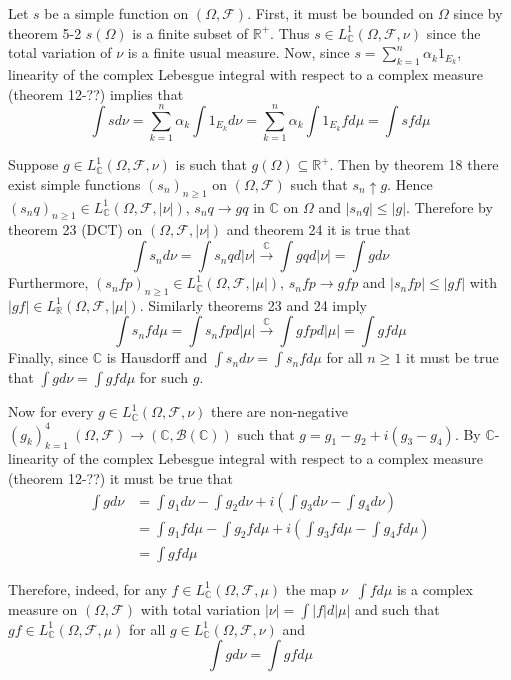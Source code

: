 \documentclass[a4paper]{article}
\newcommand{\brac}[1]{\left ( #1 \right )}
\newcommand{\abs}[1]{\left | #1 \right |}
\newcommand{\Real}{\mathbb{R}}
\newcommand{\Cplx}{\mathbb{C}}
\newcommand{\Fcal}{\mathcal{F}}
\newcommand{\borel}[1]{\mathcal{B}\brac{#1}}
\newcommand{\defn}{\mathop{\overset{\Delta}{=}}\nolimits}
\begin{document}
Let $s$ be a simple function on $\brac{\Omega, \Fcal}$. First, it must be bounded on $\Omega$ since by theorem 5-2 $s\brac{\Omega}$ is a finite subset of $\Real^+$. Thus $s\in L^1_\Cplx\brac{\Omega, \Fcal, \nu}$ since the total variation of $\nu$ is a finite usual measure. Now, since $s=\sum_{k=1}^n \alpha_k 1_{E_k}$, linearity of the complex Lebesgue integral with respect to a complex measure (theorem 12-??) implies that \[\int s d\nu = \sum_{k=1}^n \alpha_k \int 1_{E_k} d\nu = \sum_{k=1}^n \alpha_k \int 1_{E_k} f d\mu = \int s f d\mu\]

Suppose $g\in L^1_\Cplx\brac{\Omega,\Fcal,\nu}$ is such that $g\brac{\Omega}\subseteq \Real^+$. Then by theorem 18 there exist simple functions $\brac{s_n}_{n\geq1}$ on $\brac{\Omega,\Fcal}$ such that $s_n\uparrow g$. Hence $\brac{s_n q}_{n\geq1}\in L^1_\Cplx\brac{\Omega, \Fcal, \abs{\nu}}$, $s_n q\to g q$ in $\Cplx$ on $\Omega$ and $\abs{s_n q} \leq \abs{g}$. Therefore by theorem 23 (DCT) on $\brac{\Omega,\Fcal,\abs{\nu}}$ and theorem 24 it is true that \[\int s_n d\nu = \int s_n q d\abs{\nu} \overset{\Cplx}{\to} \int g q d\abs{\nu} = \int g d\nu\] Furthermore, $\brac{s_n f p}_{n\geq1}\in L^1_\Cplx\brac{\Omega,\Fcal,\abs{\mu}}$, $s_n f p \to g f p$ and $\abs{s_n f p}\leq \abs{g f}$ with $\abs{g f}\in L^1_\Real\brac{\Omega,\Fcal,\abs{\mu}}$. Similarly theorems 23 and 24 imply \[\int s_n f d\mu = \int s_n f p d\abs{\mu}\overset{\Cplx}{\to}\int g f p d\abs{\mu} = \int g f d\mu\] Finally, since $\Cplx$ is Hausdorff and $\int s_n d\nu = \int s_n f d\mu$ for all $n\geq1$ it must be true that $\int g d\nu = \int g f d\mu$ for such $g$.

Now for every $g\in L^1_\Cplx\brac{\Omega,\Fcal,\nu}$ there are non-negative $\brac{g_k}_{k=1}^4\:\brac{\Omega,\Fcal}\to\brac{\Cplx,\borel{\Cplx}}$ such that $g = g_1-g_2 + i\brac{g_3-g_4}$. By $\Cplx$-linearity of the complex Lebesgue integral with respect to a complex measure (theorem 12-??) it must be true that \begin{align*}\int g d\nu &= \int g_1 d\nu - \int g_2 d\nu  + i\brac{\int g_3 d\nu  - \int g_4 d\nu }\\ &= \int g_1 f d\mu - \int g_2 f d\mu  + i\brac{\int g_3 f d\mu  - \int g_4 f d\mu } \\&= \int g f d\mu\end{align*}

Therefore, indeed, for any $f\in L^1_\Cplx\brac{\Omega, \Fcal, \mu}$ the map $\nu\defn \int f d\mu$ is a complex measure on $\brac{\Omega, \Fcal}$ with total variation $\abs{\nu}=\int \abs{f}d\abs{\mu}$ and such that $g f\in L^1_\Cplx\brac{\Omega, \Fcal, \mu}$ for all $g\in L^1_\Cplx\brac{\Omega, \Fcal, \nu}$ and \[\int g d\nu = \int g f d\mu\]
\end{document}
